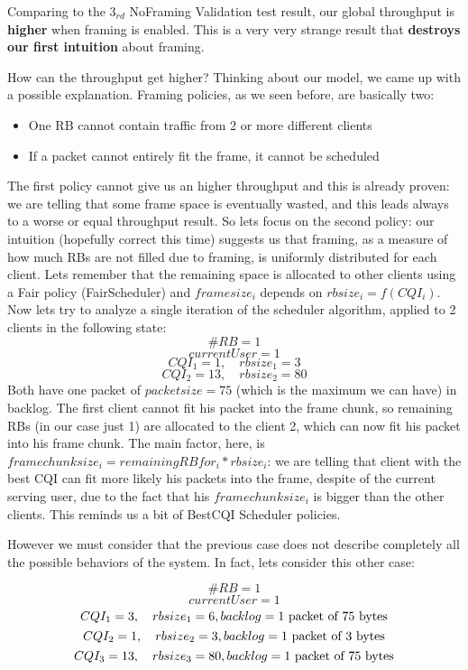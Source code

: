 Comparing to the \(3_{rd}\) NoFraming Validation test result, our global throughput is \textbf{higher} when framing is enabled. This is a very very strange result that \textbf{destroys our first intuition} about framing.

How can the throughput get higher? Thinking about our model, we came up with a possible explanation. Framing policies, as we seen before, are basically two:
\begin{itemize}
	\item One RB cannot contain traffic from 2 or more different clients
	\item If a packet cannot entirely fit the frame, it cannot be scheduled
\end{itemize}
The first policy cannot give us an higher throughput and this is already proven: we are telling that some frame space is eventually wasted, and this leads always to a worse or equal throughput result. So lets focus on the second policy: our intuition (hopefully correct this time) suggests us that framing, as a measure of how much RBs are not filled due to framing, is uniformly distributed for each client. Lets remember that the remaining space is allocated to other clients using a Fair policy (FairScheduler) and \(framesize_i\) depends on \(rbsize_i = f(CQI_i)\). Now lets try to analyze a single iteration of the scheduler algorithm, applied to 2 clients in the following state:
\[\#RB = 1\]
\[currentUser = 1\]
\[CQI_1 = 1, \quad rbsize_1 = 3\]
\[CQI_2 = 13, \quad rbsize_2 = 80\]
Both have one packet of \(packetsize=75\) (which is the maximum we can have) in backlog. The first client cannot fit his packet into the frame chunk, so remaining RBs (in our case just 1) are allocated to the client 2, which can now fit his packet into his frame chunk. The main factor, here, is \(framechunksize_i = remainingRBfor_i * rbsize_i\): we are telling that client with the best CQI can fit more likely his packets into the frame, despite of the current serving user, due to the fact that his \(framechunksize_i\) is bigger than the other clients. This reminds us a bit of BestCQI Scheduler policies.

However we must consider that the previous case does not describe completely all the possible behaviors of the system. In fact, lets consider this other case:

\[\#RB = 1\]
\[currentUser = 1\]
\[CQI_1 = 3, \quad rbsize_1 = 6, backlog = \textnormal{1 packet of 75 bytes}\]
\[CQI_2 = 1, \quad rbsize_2 = 3, backlog = \textnormal{1 packet of 3 bytes}\]
\[CQI_3 = 13, \quad rbsize_3 = 80, backlog = \textnormal{1 packet of 75 bytes}\]

